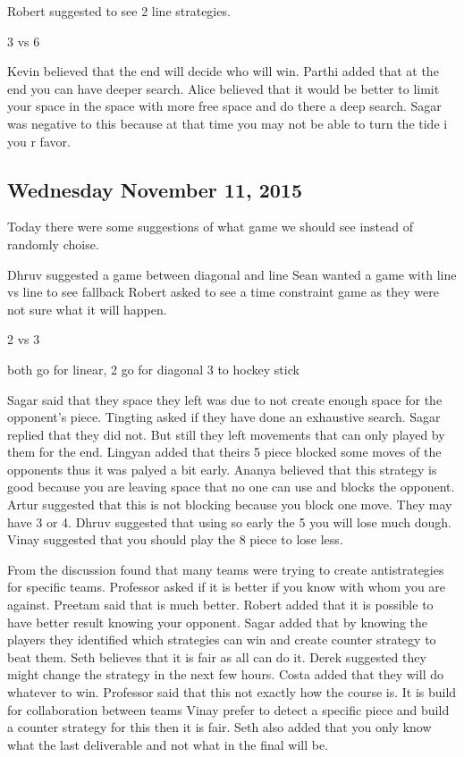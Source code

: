 Robert suggested to see 2 line strategies.


3 vs 6

Kevin believed that the end will decide who will win.
Parthi added that at the end you can have deeper search.
Alice believed that it would be better to limit your space in the space with more free space and do there a deep search.
Sagar was negative to this because at that time you may not be able to turn the tide i you r favor.

\subsection{Wednesday November 11, 2015}
Today there were some suggestions of what game we should see instead of randomly choise.

Dhruv suggested a game between diagonal and line
Sean wanted a game with line vs line to see fallback
Robert asked to see a  time constraint game as they were not sure what it will happen.


2 vs 3 

both go for linear, 2 go for diagonal 3 to hockey stick

Sagar said that they space they left was due to not create enough space for the opponent’s piece.
Tingting asked if they have done an exhaustive search.
Sagar replied that they did not. But still they left movements that can only played by them for the end.
Lingyan added that theirs 5 piece blocked some moves of the opponents thus it was palyed a bit early.
Ananya believed that this strategy is good because you are leaving space that no one can use and blocks the opponent.
Artur suggested that this is not blocking because you block one move. They may have 3 or 4.
Dhruv suggested that using so early the 5 you will lose much dough.
Vinay suggested that you should play the 8 piece to lose less.


From the discussion found that many teams were trying to create antistrategies for specific teams.
Professor asked if it is better if you know with whom you are against.
Preetam said that is much better.
Robert added that it is possible to have better result knowing your opponent.
Sagar added that by knowing the players they identified which strategies can win and create counter strategy to beat them.
Seth believes that it is fair as all can do it.
Derek suggested they might change the strategy in the next few hours.
Costa added that they will do whatever to win.
Professor said that this not exactly how the course is. It is build for collaboration between teams
Vinay prefer to detect a specific piece and build a counter strategy for this then it is fair.
Seth also added that you only know what the last deliverable and not what in the final will be.


